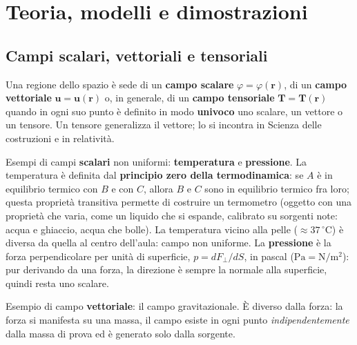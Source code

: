 \documentclass[11pt,a4paper]{article}
\newcommand{\vv}[1]{\mathbf{#1}}
\begin{document}
\section{Teoria, modelli e dimostrazioni}

\subsection{Campi scalari, vettoriali e tensoriali}
Una regione dello spazio è sede di un \textbf{campo scalare} $\varphi=\varphi(\vv r)$, di un \textbf{campo vettoriale} $\vv u=\vv u(\vv r)$ o, in generale, di un \textbf{campo tensoriale} $\vv T=\vv T(\vv r)$ quando in ogni suo punto è definito in modo \textbf{univoco} uno scalare, un vettore o un tensore. Un tensore generalizza il vettore; lo si incontra in Scienza delle costruzioni e in relatività.

Esempi di campi \textbf{scalari} non uniformi: \textbf{temperatura} e \textbf{pressione}. La temperatura è definita dal \textbf{principio zero della termodinamica}: se $A$ è in equilibrio termico con $B$ e con $C$, allora $B$ e $C$ sono in equilibrio termico fra loro; questa proprietà transitiva permette di costruire un termometro (oggetto con una proprietà che varia, come un liquido che si espande, calibrato su sorgenti note: acqua e ghiaccio, acqua che bolle). La temperatura vicino alla pelle ($\approx37\,^\circ\mathrm{C}$) è diversa da quella al centro dell'aula: campo non uniforme. La \textbf{pressione} è la forza perpendicolare per unità di superficie, $p=dF_\perp/dS$, in pascal ($\mathrm{Pa}=\mathrm{N/m^2}$): pur derivando da una forza, la direzione è sempre la normale alla superficie, quindi resta uno scalare.

Esempio di campo \textbf{vettoriale}: il campo gravitazionale. È diverso dalla forza: la forza si manifesta su una massa, il campo esiste in ogni punto \emph{indipendentemente} dalla massa di prova ed è generato solo dalla sorgente.
\end{document}
